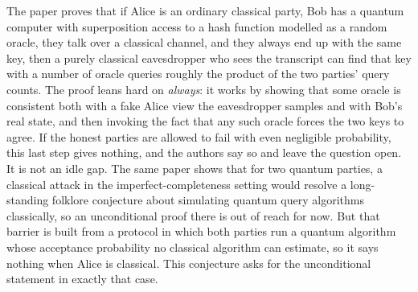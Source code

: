 \documentclass{aicr-conjecture}
\begin{document}

\vspace{0.4em}

\begin{informalconjecture}
The paper proves that if Alice is an ordinary classical party, Bob has a
quantum computer with superposition access to a hash function modelled
as a random oracle, they talk over a classical channel, and they always
end up with the same key, then a purely classical eavesdropper who sees
the transcript can find that key with a number of oracle queries roughly
the product of the two parties' query counts. The proof leans hard on
\emph{always}: it works by showing that some oracle is consistent both
with a fake Alice view the eavesdropper samples and with Bob's real
state, and then invoking the fact that any such oracle forces the two
keys to agree. If the honest parties are allowed to fail with even
negligible probability, this last step gives nothing, and the authors
say so and leave the question open. It is not an idle gap. The same
paper shows that for two quantum parties, a classical attack in the
imperfect-completeness setting would resolve a long-standing folklore
conjecture about simulating quantum query algorithms classically, so an
unconditional proof there is out of reach for now. But that barrier is
built from a protocol in which both parties run a quantum algorithm
whose acceptance probability no classical algorithm can estimate, so it
says nothing when Alice is classical. This conjecture asks for the
unconditional statement in exactly that case.
\end{informalconjecture}
\end{document}
